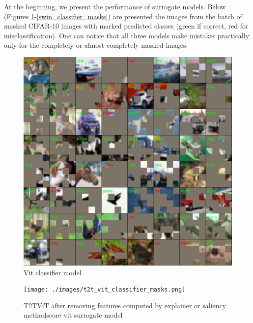 \documentclass[magisterska,en]{pracamgr}
\begin{document}
At the beginning, we present the performance of surrogate models. Below (Figures \ref{vit_classifier_masks}-\ref{swin_classifier_masks}) are presented the images from the batch of masked CIFAR-10 images with marked predicted classes (green if correct, red for misclassification). One can notice that all three models make mistakes practically only for the completely or almost completely masked images.

\begin{figure}[H]
\centering
\includegraphics[scale=0.5]{./images/vit_classifier_masks.png}
\caption{Vit classifier model}
\label{vit_classifier_masks}
\end{figure}


\begin{figure}[H]
\centering
\texttt{[image: ./images/t2t\_vit\_classifier\_masks.png]}
\caption{T2T\textunderscore ViT after removing features computed by explainer or saliency methodscore vit surrogate model}
\label{t2t_vit_classifier_masks}
\end{figure}
\end{document}
